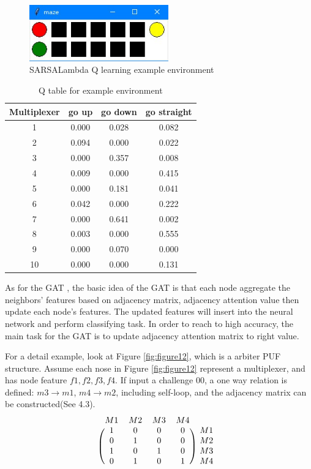 \begin{figure}[htp]
    \centering
    \includegraphics[width=6cm]{figures/figure11.jpg}
    \caption{SARSALambda Q learning example environment}
    \label{fig:figure11}
    \end{figure}

\begin{table}[ht]
    \center
    \begin{tabular}{c|ccc}
    Multiplexer & go up & go down & go straight\\
    \hline
    1 & 0.000 & 0.028 & 0.082\\
    2 & 0.094 & 0.000 & 0.022\\
    3 & 0.000 & 0.357 & 0.008\\
    4 & 0.009 & 0.000 & 0.415\\
    5 & 0.000 & 0.181 & 0.041\\
    6 & 0.042 & 0.000 & 0.222\\
    7 & 0.000 & 0.641 & 0.002\\
    8 & 0.003 & 0.000 & 0.555\\
    9 & 0.000 & 0.070 & 0.000\\
    10 & 0.000 & 0.000 & 0.131\\
    \end{tabular}
    \caption{Q table for example environment}
    \label{tab:table1}
    \end{table}

As for the GAT \cite{Reference10}, the basic idea of the GAT is that each node aggregate the neighbors' features based on adjacency matrix, adjacency attention value then update each node's features. 
The updated features will insert into the neural network and perform classifying task. In order to reach to high accuracy, the main task for the GAT is to update adjacency attention matrix to
right value.

For a detail example, look at Figure \ref{fig:figure12}, which is a arbiter PUF structure. Assume each nose in Figure \ref{fig:figure12} represent a multiplexer, and has node feature $f1,f2,f3,f4$. If input a 
challenge 00, a one way relation is defined: 
$m3 \rightarrow m1$, $m4 \rightarrow m2$, including self-loop, and the adjacency matrix can be constructed(See 4.3). 
\begin{equation}
    \begin{blockarray}{ccccc}
    M1 & M2 & M3 & M4\\
    \begin{block}{(cccc)c}
        1 & 0 & 0 & 0 & M1\\
        0 & 1 & 0 & 0 & M2\\
        1 & 0 & 1 & 0 & M3\\
        0 & 1 & 0 & 1 & M4\\
    \end{block}
    \end{blockarray}
    \label{matrix}
\end{equation}

